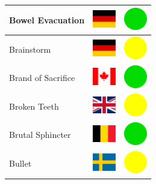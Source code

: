 \documentclass[12pt, a4paper, twoside]{report}
\begin{document}
\begin{center}
\begin{longtable}{|p{5cm}|p{2cm}|p{2cm}|}
			Bowel Evacuation & \includegraphics[width=1cm]{4x3/de} & \includegraphics[width=1cm]{likes/y} \\ \hline
			Brainstorm & \includegraphics[width=1cm]{4x3/de} & \includegraphics[width=1cm]{likes/m} \\ \hline
			Brand of Sacrifice & \includegraphics[width=1cm]{4x3/ca} & \includegraphics[width=1cm]{likes/y} \\ \hline
			Broken Teeth & \includegraphics[width=1cm]{4x3/gb} & \includegraphics[width=1cm]{likes/m} \\ \hline
			Brutal Sphincter & \includegraphics[width=1cm]{4x3/be} & \includegraphics[width=1cm]{likes/y} \\ \hline
			Bullet & \includegraphics[width=1cm]{4x3/se} & \includegraphics[width=1cm]{likes/m} \\ \hline

\end{longtable}
\end{center}
\end{document}

